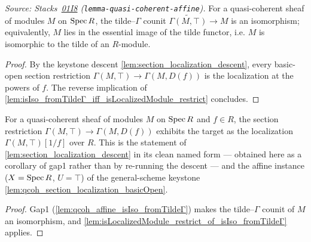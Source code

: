 \begin{lemma}
  \label{lem:qcoh_affine_isIso_fromTildeΓ}
  \leanok
  \textit{Source: Stacks~\href{https://stacks.math.columbia.edu/tag/01I8}{01I8}
  (\texttt{lemma-quasi-coherent-affine}).}
  For a quasi-coherent sheaf of modules \(M\) on \(\operatorname{Spec} R\), the tilde--\(\Gamma\)
  counit \(\widetilde{\Gamma(M, \top)} \to M\) is an isomorphism; equivalently, \(M\)
  lies in the essential image of the tilde functor, i.e. \(M\) is isomorphic to the
  tilde of an \(R\)-module.
\end{lemma}
\begin{proof}
  \leanok
  By the keystone descent \cref{lem:section_localization_descent}, every basic-open
  section restriction \(\Gamma(M, \top) \to \Gamma(M, D(f))\) is the localization at the
  powers of \(f\). The reverse implication of
  \cref{lem:isIso_fromTildeΓ_iff_isLocalizedModule_restrict} concludes.
\end{proof}

\begin{lemma}
  \label{lem:qcoh_affine_section_localization}
  \leanok
  For a quasi-coherent sheaf of modules \(M\) on \(\operatorname{Spec} R\) and \(f \in R\), the
  section restriction \(\Gamma(M, \top) \to \Gamma(M, D(f))\) exhibits the target as the
  localization \(\Gamma(M, \top)[1/f]\) over \(R\). This is the statement of
  \cref{lem:section_localization_descent} in its clean named form — obtained here as a
  corollary of gap1 rather than by re-running the descent — and the affine instance
  (\(X = \operatorname{Spec} R\), \(U = \top\)) of the general-scheme keystone
  \cref{lem:qcoh_section_localization_basicOpen}.
\end{lemma}
\begin{proof}
  \leanok
  Gap1 (\cref{lem:qcoh_affine_isIso_fromTildeΓ}) makes the tilde--\(\Gamma\) counit of
  \(M\) an isomorphism, and
  \cref{lem:isLocalizedModule_restrict_of_isIso_fromTildeΓ} applies.
\end{proof}


